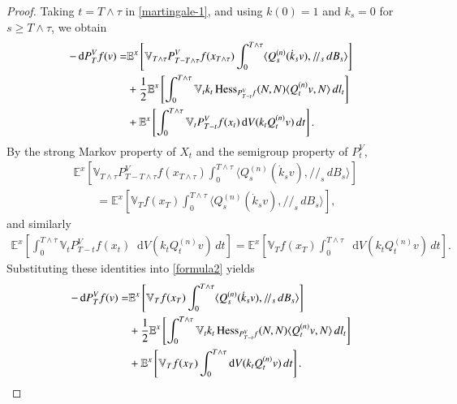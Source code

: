 \documentclass[11pt,twoside, reqno]{article}
\newcommand{\ed}{\mathop{}\!\mathrm{d}}
\def\mathpal#1{\mathop{\mathchoice{\text{\rm #1}}%
   {\text{\rm #1}}{\text{\rm #1}}%
   {\text{\rm #1}}}\nolimits}
\newcommand\Hess{\mathpal{Hess}}
\newcommand\1{\mathbbm{1}}
\theoremstyle{definition}
\numberwithin{equation}{section}
\begin{document}
\begin{proof}
Taking $t=T\wedge\tau$ in \eqref{martingale-1}, and using $k(0)=1$ and
$k_s=0$ for $s\geq T\wedge\tau$, we obtain
\begin{align}\label{formula2}
        -\ed P_T^Vf(v)
        =&\mathbb E^x\left[
        \mathbb V_{T\wedge\tau}P_{T-T\wedge\tau}^Vf(x_{T\wedge\tau})
        \int_0^{T\wedge\tau}
        \langle Q_s^{(n)}(\dot k_sv),/\!/_s\,dB_s\rangle
        \right]
        \notag\\
        &+\frac12\mathbb E^x\left[
        \int_0^{T\wedge\tau}\mathbb V_tk_t
        \Hess_{P_{T-t}^Vf}(N,N)
        \langle Q_t^{(n)}v,N\rangle\,dl_t
        \right]
        \notag\\
        &+\mathbb E^x\left[
        \int_0^{T\wedge\tau}\mathbb V_tP_{T-t}^Vf(x_t)
        \ed V(k_tQ_t^{(n)}v)\,dt
        \right].
\end{align}
By the strong Markov property of $X_t$ and the semigroup property of $P_t^V$,
\begin{align*}
        &\mathbb E^x\left[
        \mathbb V_{T\wedge\tau}P_{T-T\wedge\tau}^Vf(x_{T\wedge\tau})
        \int_0^{T\wedge\tau}
        \langle Q_s^{(n)}(\dot k_sv),/\!/_s\,dB_s\rangle
        \right]
        \\
        &\qquad=
        \mathbb E^x\left[
        \mathbb V_Tf(x_T)
        \int_0^{T\wedge\tau}
        \langle Q_s^{(n)}(\dot k_sv),/\!/_s\,dB_s\rangle
        \right],
\end{align*}
and similarly
\begin{align*}
        \mathbb E^x\left[
        \int_0^{T\wedge\tau}\mathbb V_tP_{T-t}^Vf(x_t)
        \ed V(k_tQ_t^{(n)}v)\,dt
        \right]
        =
        \mathbb E^x\left[
        \mathbb V_Tf(x_T)
        \int_0^{T\wedge\tau}\ed V(k_tQ_t^{(n)}v)\,dt
        \right].
\end{align*}
Substituting these identities into \eqref{formula2} yields
\begin{align}\label{formula3}
        -\ed P_T^Vf(v)
        =&\mathbb E^x\left[
        \mathbb V_Tf(x_T)
        \int_0^{T\wedge\tau}
        \langle Q_s^{(n)}(\dot k_sv),/\!/_s\,dB_s\rangle
        \right]
        \notag\\
        &+\frac12\mathbb E^x\left[
        \int_0^{T\wedge\tau}\mathbb V_tk_t
        \Hess_{P_{T-t}^Vf}(N,N)
        \langle Q_t^{(n)}v,N\rangle\,dl_t
        \right]
        \notag\\
        &+\mathbb E^x\left[
        \mathbb V_Tf(x_T)
        \int_0^{T\wedge\tau}\ed V(k_tQ_t^{(n)}v)\,dt
        \right].
\end{align}


\end{proof}
\end{document}

